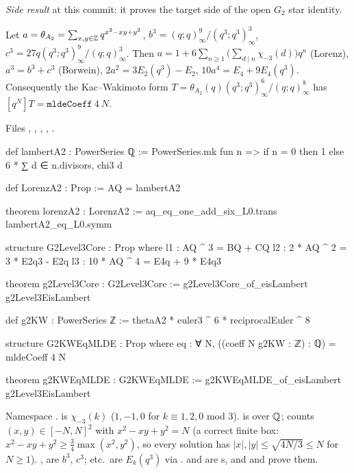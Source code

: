 \noindent\emph{Side result} at this commit: it proves the target side of the open $G_2$ star identity.
\begin{theorem}\label{l25:thm:g2target}
Let $a=\theta_{A_2}=\sum_{x,y\in{\mathbb{Z}}}q^{x^2-xy+y^2}$, $b^3=(q;q)^9_\infty/(q^3;q^3)^3_\infty$, $c^3=27q(q^3;q^3)^9_\infty/(q;q)^3_\infty$.
Then $a=1+6\sum_{n\ge1}\big(\sum_{d\mid n}\chi_{-3}(d)\big)q^n$ (Lorenz), $a^3=b^3+c^3$ (Borwein), $2a^2=3E_2(q^3)-E_2$,
$10a^4=E_4+9E_4(q^3)$. Consequently the Kac--Wakimoto form $T=\theta_{A_2}(q)(q^3;q^3)^6_\infty/(q;q)^8_\infty$ has
$[q^N]T=\mathtt{mldeCoeff}\ 4\ N$.
\end{theorem}
\noindent Files ,
, , ,
.
\begin{leancode}
def lambertA2 : PowerSeries ℚ :=
  PowerSeries.mk fun n => if n = 0 then 1 else 6 * ∑ d ∈ n.divisors, chi3 d

def LorenzA2 : Prop := AQ = lambertA2

theorem lorenzA2 : LorenzA2 := aq_eq_one_add_six_L0.trans lambertA2_eq_L0.symm

structure G2Level3Core : Prop where
  l1 : AQ ^ 3 = BQ + CQ
  l2 : 2 * AQ ^ 2 = 3 * E2q3 - E2q
  l3 : 10 * AQ ^ 4 = E4q + 9 * E4q3

theorem g2Level3Core : G2Level3Core := g2Level3Core_of_eisLambert g2Level3EisLambert

def g2KW : PowerSeries ℤ := thetaA2 * euler3 ^ 6 * reciprocalEuler ^ 8

structure G2KWEqMLDE : Prop where
  eq : ∀ N, ((coeff N g2KW : ℤ) : ℚ) = mldeCoeff 4 N

theorem g2KWEqMLDE : G2KWEqMLDE := g2KWEqMLDE_of_eisLambert g2Level3EisLambert
\end{leancode}
\begin{dictionary}
Namespace .  is $\chi_{-3}(k)$ ($1,-1,0$ for $k\equiv1,2,0$ mod 3).  is
 over ${\mathbb{Q}}$;  counts $(x,y)\in[-N,N]^2$ with $x^2-xy+y^2=N$ (a correct finite box: $x^2-xy+y^2\ge\frac34\max(x^2,y^2)$, so every solution has
$|x|,|y|\le\sqrt{4N/3}\le N$ for $N\ge1$). ,
 are $b^3$, $c^3$;  etc.\ are $E_k(q^3)$ via .  and
 are s, and  and  prove them.
\end{dictionary}
